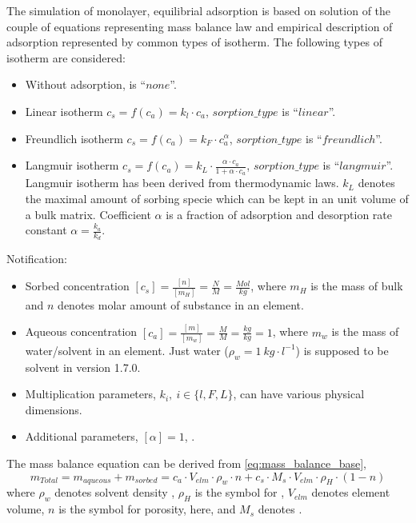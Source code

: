 The simulation of monolayer, equilibrial adsorption is based on solution of the couple of equations representing mass balance law and empirical description of adsorption represented by common types of isotherm. The following types of isotherm are considered:
\begin{itemize}
 \item Without adsorption,  is ``$none$''.
 \item Linear isotherm $c_s = f(c_a) = k_l\cdot c_a$, $sorption\_type$ is ``$linear$''.
 \item Freundlich isotherm $c_s = f(c_a) = k_F\cdot c_a^{\alpha}$, $sorption\_type$ is ``$freundlich$''.
 \item Langmuir isotherm $c_s = f(c_a) = k_L\cdot \frac{\alpha\cdot c_a}{1 + \alpha\cdot c_a}$, $sorption\_type$ is ``$langmuir$''. Langmuir isotherm has been derived from thermodynamic laws. $k_L$ denotes the maximal amount of sorbing specie which can be kept in an unit volume of a bulk matrix. Coefficient $\alpha$ is a fraction of adsorption and desorption rate constant $\alpha = \frac{k_a}{k_d}$.
\end{itemize}
Notification:
\begin{itemize}
 \item Sorbed concentration $[c_s] = \frac{[n]}{[m_H]} = \frac{N}{M} = \frac{Mol}{kg}$, where $m_H$ is the mass of bulk and $n$ denotes molar amount of substance in an element.
 \item Aqueous concentration $[c_a] = \frac{[m]}{[m_w]} = \frac{M}{M} = \frac{kg}{kg} = 1$, where $m_w$ is the mass of water/solvent in an element. Just water ($\rho_w = 1~kg\cdot l^{-1}$) is supposed to be solvent in version 1.7.0. 
 \item Multiplication parameters, $k_i, ~i\in\{ l,F,L\}$,  can have various physical dimensions.
 \item Additional parameters, $[\alpha] = 1$, .
\end{itemize}
The mass balance equation can be derived from \ref{eq:mass_balance_base},
\begin{equation}
  m_{Total} = m_{aqueous} + m_{sorbed} = c_a\cdot V_{elm}\cdot\rho_w\cdot n + c_s\cdot M_s \cdot V_{elm}\cdot\rho_H\cdot(1-n)
  \label{eq:mass_balance_base}
\end{equation}
where $\rho_w$ denotes solvent density , $\rho_H$ is the symbol for , $V_{elm}$ denotes element volume, $n$ is the symbol for porosity, here, and $M_s$ denotes .


